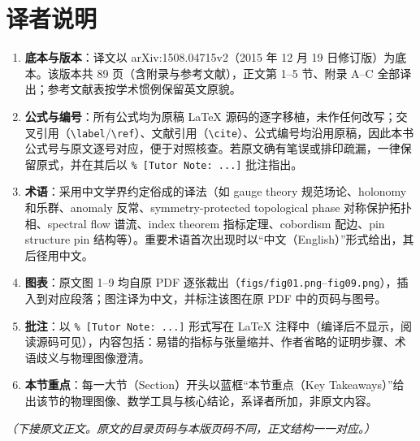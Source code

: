 \section*{译者说明}

\begin{enumerate}[label=\arabic*.,leftmargin=2.2em,itemsep=0.25em]
  \item \textbf{底本与版本}：译文以 arXiv:1508.04715v2（2015 年 12 月 19 日修订版）为底本。该版本共 89 页（含附录与参考文献），正文第 1--5 节、附录 A--C 全部译出；参考文献表按学术惯例保留英文原貌。
  \item \textbf{公式与编号}：所有公式均为原稿 LaTeX 源码的逐字移植，未作任何改写；交叉引用（\verb|\label|/\verb|\ref|）、文献引用（\verb|\cite|）、公式编号均沿用原稿，因此本书公式号与原文逐号对应，便于对照核查。若原文确有笔误或排印疏漏，一律保留原式，并在其后以 \verb|% [Tutor Note: ...]| 批注指出。
  \item \textbf{术语}：采用中文学界约定俗成的译法（如 gauge theory 规范场论、holonomy 和乐群、anomaly 反常、symmetry-protected topological phase 对称保护拓扑相、spectral flow 谱流、index theorem 指标定理、cobordism 配边、pin structure pin 结构等）。重要术语首次出现时以“中文（English）”形式给出，其后径用中文。
  \item \textbf{图表}：原文图 1--9 均自原 PDF 逐张裁出（\texttt{figs/fig01.png}--\texttt{fig09.png}），插入到对应段落；图注译为中文，并标注该图在原 PDF 中的页码与图号。
  \item \textbf{批注}：以 \verb|% [Tutor Note: ...]| 形式写在 LaTeX 注释中（编译后不显示，阅读源码可见），内容包括：易错的指标与张量缩并、作者省略的证明步骤、术语歧义与物理图像澄清。
  \item \textbf{本节重点}：每一大节（Section）开头以蓝框“本节重点（Key Takeaways）”给出该节的物理图像、数学工具与核心结论，系译者所加，非原文内容。
\end{enumerate}

\vspace{0.5em}
\noindent\textit{（下接原文正文。原文的目录页码与本版页码不同，正文结构一一对应。）}
